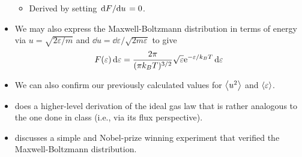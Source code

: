\documentclass[../notes.tex]{subfiles}
\begin{document}
\begin{itemize}
\begin{itemize}
        \item Derived by setting $\dv*{F}{u}=0$.
    \end{itemize}
    \item We may also express the Maxwell-Boltzmann distribution in terms of energy via $u=\sqrt{2\varepsilon/m}$ and $\dd{u}=\dd{\varepsilon}/\sqrt{2m\varepsilon}$ to give
    \begin{equation*}
        F(\varepsilon)\dd{\varepsilon} = \frac{2\pi}{(\pi k_BT)^{3/2}}\sqrt{\varepsilon}\e[-\varepsilon/k_BT]\dd{\varepsilon}
    \end{equation*}
    \item We can also confirm our previously calculated values for $\prb{u^2}$ and $\prb{\varepsilon}$.
    \item \textcite{bib:McQuarrieSimon} does a higher-level derivation of the ideal gas law that is rather analogous to the one done in class (i.e., via its flux perspective).
    \item \textcite{bib:McQuarrieSimon} discusses a simple and Nobel-prize winning experiment that verified the Maxwell-Boltzmann distribution.
\end{itemize}
\end{document}
